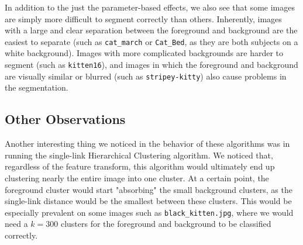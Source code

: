 \documentclass[12pt]{article}
\begin{document}
In addition to the just the parameter-based effects, we also see that some images are simply more difficult to segment correctly than others. Inherently, images with a large and clear separation between the foreground and background are the easiest to separate (such as \texttt{cat\_march} or \texttt{Cat\_Bed}, as they are both subjects on a white background). Images with more complicated backgrounds are harder to segment (such as \texttt{kitten16}), and images in which the foreground and background are visually similar or blurred (such as \texttt{stripey-kitty}) also cause problems in the segmentation.

\subsection{Other Observations}
Another interesting thing we noticed in the behavior of these algorithms was in running the single-link Hierarchical Clustering algorithm. We noticed that, regardless of the feature transform, this algorithm would ultimately end up clustering nearly the entire image into one cluster. At a certain point, the foreground cluster would start "absorbing" the small background clusters, as the single-link distance would be the smallest between these clusters. This would be especially prevalent on some images such as \texttt{black\_kitten.jpg}, where we would need a $k = 300$ clusters for the foreground and background to be classified correctly.
\end{document}
